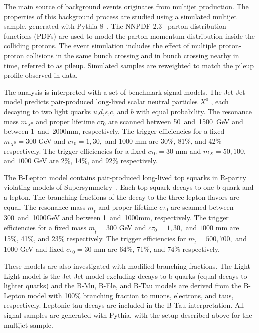 The main source of background events originates from multijet
production. The properties of this background process are studied
using a simulated multijet sample, generated with
Pythia 8~\cite{Sjostrand:2007gs}. The NNPDF 2.3~\cite{NNPDF23}
parton distribution functions (PDFs) are used to model the parton
momentum distribution inside the colliding protons. The event
simulation includes the effect of multiple proton-proton collisions in
the same bunch crossing and in bunch crossing nearby in time, referred
to as pileup. Simulated samples are reweighted to match the pileup
profile observed in data.

The analysis is interpreted with a set of benchmark signal models.
The Jet-Jet model predicts pair-produced long-lived
scalar neutral particles $X^{0}$ \cite{ScalarX}, each decaying to two light quarks $u$,$d$,$s$,$c$, and $b$
with equal probability. The resonance
mass $m_{X^0}$ and proper lifetime $c\tau_0$ are scanned between
50~and~1500~GeV and between 1~and~2000mm, respectively. The
trigger efficiencies for a fixed  $m_{X^0}=300$ GeV and 
$c\tau_0 = 1, 30,$ and $1000$ mm are 30\%, 81\%, and 42\%  
 respectively. The trigger efficiencies for a fixed  $c\tau_0=30$
 mm and $m_{X} = 50, 100,$ and $1000$ GeV
 are 2\%, 14\%, and 92\%  respectively.

The B-Lepton model contains pair-produced long-lived top squarks
in R-parity violating models of Supersymmetry~\cite{displacedsusy}. Each top squark decays
to one b quark and a lepton. The branching fractions of the
decay to the three lepton flavors are equal. The
resonance mass $m_{\tilde{t}}$ and proper lifetime $c\tau_0$ are
scanned between 300~and~1000GeV and between 1~and~1000mm,
respectively. The trigger efficiencies for a fixed mass 
$m_{\tilde{t}}=300$ GeV and $c\tau_0 = 1, 30,$ and $1000$ mm
 are 15\%, 41\%, and 23\%  respectively.
The trigger efficiencies for  $m_{\tilde{t}} = 500, 700,$ and $1000$ GeV and fixed  $c\tau_0=30$ mm are 64\%, 71\%, and 74\% respectively.

These models are also investigated with modified
branching fractions.  The Light-Light model is the Jet-Jet
model excluding decays to b quarks (equal decays to lighter quarks)
and the B-Mu, B-Ele, and B-Tau models are
derived from the B-Lepton model with 100\% branching fraction to
muons, electrons, and taus, respectively.  Leptonic tau decays are included 
in the B-Tau interpretation. All signal samples are
generated with Pythia, with the setup described above for the
multijet sample. 

